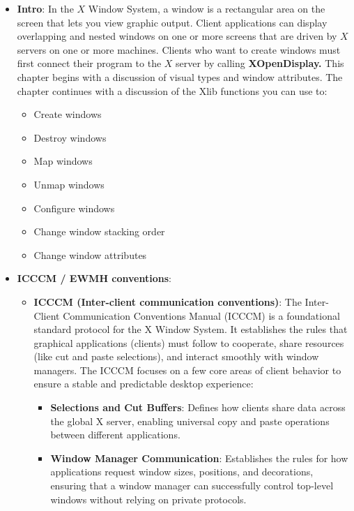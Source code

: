 \documentclass{report}
\begin{document}
    \pagebreak 
    \begin{itemize}
        \item \textbf{Intro}: In the $X$ Window System, a window is a rectangular area on the screen that lets you view graphic output. Client applications can display overlapping and nested windows on one or more screens that are driven by $X$ servers on one or more machines. Clients who want to create windows must first connect their program to the $X$ server by calling \textbf{XOpenDisplay.} This chapter begins with a discussion of visual types and window attributes. The chapter continues with a discussion of the Xlib functions you can use to:
            \begin{itemize}
                \item Create windows
                \item Destroy windows
                \item Map windows
                \item Unmap windows
                \item Configure windows
                \item Change window stacking order
                \item Change window attributes
            \end{itemize}
        \item \textbf{ICCCM / EWMH conventions}:
            \begin{itemize}
                \item \textbf{ICCCM (Inter-client communication conventions)}: The Inter-Client Communication Conventions Manual (ICCCM) is a foundational standard protocol for the X Window System. It establishes the rules that graphical applications (clients) must follow to cooperate, share resources (like cut and paste selections), and interact smoothly with window managers. 
                    \bigbreak \noindent 
                    The ICCCM focuses on a few core areas of client behavior to ensure a stable and predictable desktop experience:
                    \begin{itemize}
                        \item \textbf{Selections and Cut Buffers}: Defines how clients share data across the global X server, enabling universal copy and paste operations between different applications.
                        \item \textbf{Window Manager Communication}: Establishes the rules for how applications request window sizes, positions, and decorations, ensuring that a window manager can successfully control top-level windows without relying on private protocols.

\end{itemize}
\end{itemize}
\end{itemize}
\end{document}
